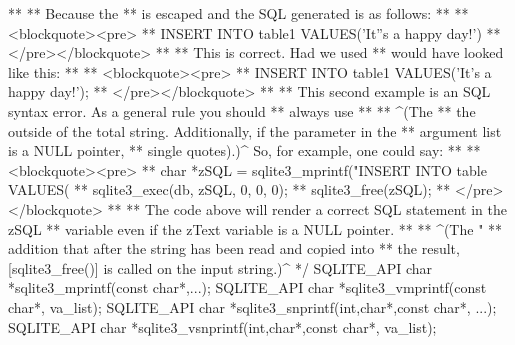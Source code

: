 \begin{Codex}[label=sqlite3.h,numbers=left]
{**
** Because the %
** is escaped and the SQL generated is as follows:
**
** <blockquote><pre>
**  INSERT INTO table1 VALUES('It''s a happy day!')
** </pre></blockquote>
**
** This is correct.  Had we used %
** would have looked like this:
**
** <blockquote><pre>
**  INSERT INTO table1 VALUES('It's a happy day!');
** </pre></blockquote>
**
** This second example is an SQL syntax error.  As a general rule you should
** always use %
**
** ^(The %
** the outside of the total string.  Additionally, if the parameter in the
** argument list is a NULL pointer, %
** single quotes).)^  So, for example, one could say:
**
** <blockquote><pre>
**  char *zSQL = sqlite3_mprintf("INSERT INTO table VALUES(%
**  sqlite3_exec(db, zSQL, 0, 0, 0);
**  sqlite3_free(zSQL);
** </pre></blockquote>
**
** The code above will render a correct SQL statement in the zSQL
** variable even if the zText variable is a NULL pointer.
**
** ^(The "%
** addition that after the string has been read and copied into
** the result, [sqlite3_free()] is called on the input string.)^
*/
SQLITE_API char *sqlite3_mprintf(const char*,...);
SQLITE_API char *sqlite3_vmprintf(const char*, va_list);
SQLITE_API char *sqlite3_snprintf(int,char*,const char*, ...);
SQLITE_API char *sqlite3_vsnprintf(int,char*,const char*, va_list);

}
\end{Codex}
